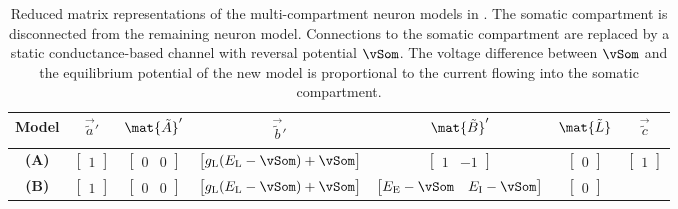 \begin{table}[p]
	\caption[Reduced matrix representations of the neuron models in ]{Reduced matrix representations of the multi-compartment neuron models in .
	The somatic compartment is disconnected from the remaining neuron model.
	Connections to the somatic compartment are replaced by a static conductance-based channel with reversal potential $\vSom$. The voltage difference between $\vSom$ and the equilibrium potential of the new model is proportional to the current flowing into the somatic compartment.
	}
	\label{tbl:nlif_matrices_reduced}
	\small\sffamily\centering
	\begin{tabular}{c c c c c c c}
		\toprule
		\multicolumn{1}{c}{\textbf{Model}\!\!} & $\vec{\tilde a}'$ & $\mat{\tilde A}'$ & $\vec{\tilde b}'$ & $\mat{\tilde B}'$ & $\mat{\tilde L}$ & $\vec{\tilde c}$\\
		\midrule
			\textbf{(A)}
			& $\displaystyle \begin{bmatrix} 1 \end{bmatrix}$
			& $\displaystyle \begin{bmatrix} 0 & 0 \end{bmatrix}$
			& $\displaystyle \begin{bmatrix} g_\mathrm{L} ( E_\mathrm{L} - \vSom ) + \vSom \end{bmatrix}$
			& $\displaystyle \begin{bmatrix} 1 & -1 \end{bmatrix}$
			& $\displaystyle \begin{bmatrix} 0 \end{bmatrix}$
			& $\displaystyle \begin{bmatrix} 1 \end{bmatrix}$\\[0.5cm]
			\textbf{(B)}
			& $\displaystyle \begin{bmatrix} 1 \end{bmatrix}$
			& $\displaystyle \begin{bmatrix} 0 & 0 \end{bmatrix}$
			& $\displaystyle \begin{bmatrix} g_\mathrm{L} ( E_\mathrm{L} - \vSom ) + \vSom \end{bmatrix}$
			& $\displaystyle \begin{bmatrix} E_\mathrm{E} - \vSom & E_\mathrm{I} - \vSom \end{bmatrix}$
			& $\displaystyle \begin{bmatrix} 0 \end{bmatrix}$

\end{tabular}
\end{table}
